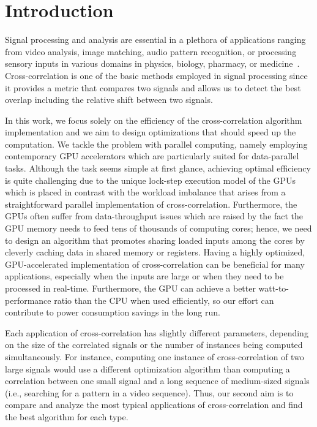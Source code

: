 \section{Introduction}\label{sec:intro}

Signal processing and analysis are essential in a plethora of applications ranging from video analysis, image matching, audio pattern recognition, or processing sensory inputs in various domains in physics, biology, pharmacy, or medicine~\cite{Kapinchev2015}. Cross-correlation is one of the basic methods employed in signal processing since it provides a metric that compares two signals and allows us to detect the best overlap including the relative shift between two signals.

In this work, we focus solely on the efficiency of the cross-correlation algorithm implementation and we aim to design optimizations that should speed up the computation. We tackle the problem with parallel computing, namely employing contemporary GPU accelerators which are particularly suited for data-parallel tasks. Although the task seems simple at first glance, achieving optimal efficiency is quite challenging due to the unique lock-step execution model of the GPUs which is placed in contrast with the workload imbalance that arises from a straightforward parallel implementation of cross-correlation. Furthermore, the GPUs often suffer from data-throughput issues which are raised by the fact the GPU memory needs to feed tens of thousands of computing cores; hence, we need to design an algorithm that promotes sharing loaded inputs among the cores by cleverly caching data in shared memory or registers. Having a highly optimized, GPU-accelerated implementation of cross-correlation can be beneficial for many applications, especially when the inputs are large or when they need to be processed in real-time. Furthermore, the GPU can achieve a better watt-to-performance ratio than the CPU when used efficiently, so our effort can contribute to power consumption savings in the long run.

Each application of cross-correlation has slightly different parameters, depending on the size of the correlated signals or the number of instances being computed simultaneously. For instance, computing one instance of cross-correlation of two large signals would use a different optimization algorithm than computing a correlation between one small signal and a long sequence of medium-sized signals (i.e., searching for a pattern in a video sequence). Thus, our second aim is to compare and analyze the most typical applications of cross-correlation and find the best algorithm for each type.

